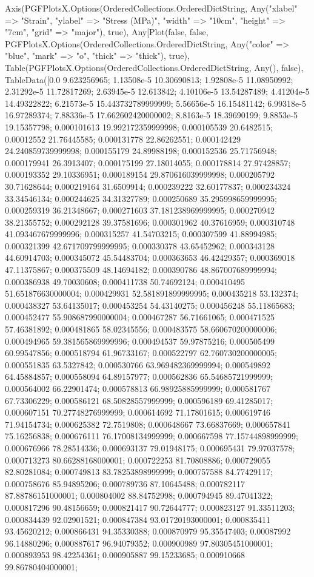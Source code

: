 Axis(PGFPlotsX.Options(OrderedCollections.OrderedDict{String, Any}("xlabel" => "Strain", "ylabel" => "Stress (MPa)", "width" => "10cm", "height" => "7cm", "grid" => "major"), true), Any[Plot(false, false, PGFPlotsX.Options(OrderedCollections.OrderedDict{String, Any}("color" => "blue", "mark" => "o", "thick" => "thick"), true), Table(PGFPlotsX.Options(OrderedCollections.OrderedDict{String, Any}(), false), TableData([0.0 9.623256965; 1.13508e-5 10.30690813; 1.92808e-5 11.08950992; 2.31292e-5 11.72817269; 2.63945e-5 12.613842; 4.10106e-5 13.54287489; 4.41204e-5 14.49322822; 6.21573e-5 15.443732789999999; 5.56656e-5 16.15481142; 6.99318e-5 16.97289374; 7.88336e-5 17.662602420000002; 8.8163e-5 18.39690199; 9.8853e-5 19.15357798; 0.000101613 19.992172359999998; 0.000105539 20.6482515; 0.00012552 21.76445585; 0.000131778 22.86262551; 0.000142429 24.240859739999998; 0.000155179 24.89988198; 0.000152536 25.71756948; 0.000179941 26.3913407; 0.000175199 27.18014055; 0.000178814 27.97428857; 0.000193352 29.10336951; 0.000189154 29.870616039999998; 0.000205792 30.71628644; 0.000219164 31.6509914; 0.000239222 32.60177837; 0.000234324 33.34546134; 0.000244625 34.31327789; 0.000250689 35.295998659999995; 0.000259319 36.21348667; 0.000271603 37.181238969999995; 0.000270942 38.21355752; 0.000292128 39.37581696; 0.000301962 40.37616959; 0.000310748 41.093467679999996; 0.000315257 41.54703215; 0.000307599 41.88994985; 0.000321399 42.671709799999995; 0.000330378 43.65452962; 0.000343128 44.60914703; 0.000345072 45.54483704; 0.000363653 46.42429357; 0.000369018 47.11375867; 0.000375509 48.14694182; 0.000390786 48.867007689999994; 0.000386938 49.70030608; 0.000411738 50.74692124; 0.000410495 51.651876630000004; 0.000429931 52.581891899999995; 0.000435218 53.132374; 0.000438327 53.64135017; 0.000453254 54.43140275; 0.000456248 55.11865683; 0.000452477 55.908687990000004; 0.000467287 56.71661065; 0.000471525 57.46381892; 0.000481865 58.02345556; 0.000483575 58.660670200000006; 0.000494965 59.381565869999996; 0.000494537 59.97875216; 0.000505499 60.99547856; 0.000518794 61.96733167; 0.000522797 62.760730200000005; 0.000551835 63.5327842; 0.000530766 63.969482369999994; 0.000549892 64.45884857; 0.000558094 64.89157977; 0.000562836 65.54685721999999; 0.000564002 66.22901474; 0.000578813 66.98925885999999; 0.000581767 67.73306229; 0.000586121 68.50828557999999; 0.000596189 69.41285017; 0.000607151 70.27748276999999; 0.000614692 71.17801615; 0.000619746 71.94154734; 0.000625382 72.7519808; 0.000648667 73.66837669; 0.000657841 75.16256838; 0.000676111 76.17008134999999; 0.000667598 77.15744898999999; 0.000676966 78.28514336; 0.000693137 79.01948175; 0.000695431 79.97037578; 0.000713273 80.66288168000001; 0.000722253 81.70808886; 0.000729055 82.80281084; 0.000749813 83.78253898999999; 0.000757588 84.77429117; 0.000758676 85.94895206; 0.000789736 87.10645488; 0.000782117 87.88786151000001; 0.000804002 88.84752998; 0.000794945 89.47041322; 0.000817296 90.48156659; 0.000821417 90.72644777; 0.000823127 91.33511203; 0.000834439 92.02901521; 0.000847384 93.01720193000001; 0.000835411 93.45620212; 0.000866431 94.35330388; 0.000870979 95.35547403; 0.00087992 96.14880296; 0.000887617 96.94079352; 0.000900989 97.80305451000001; 0.000893953 98.42254361; 0.000905887 99.15233685; 0.000910668 99.86780404000001; 
